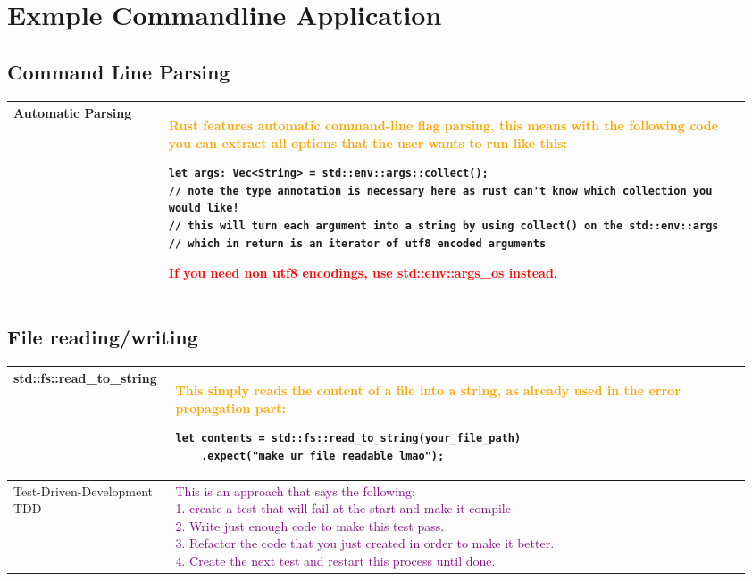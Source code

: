 \documentclass[main.tex,fontsize=8pt,paper=a4,paper=portrait,DIV=calc,]{scrartcl}
\begin{document}
\begin{table}[ht!]
\section{Exmple Commandline Application}
\subsection{Command Line Parsing}
\begin{tabular}{|m{0.2\linewidth}|m{0.755\linewidth}|}
\hline
Automatic Parsing & 
\textcolor{orange}{Rust features automatic command-line flag parsing, this means with the following code you can extract all options that the user wants to run like this:}\newline
\begin{lstlisting}
let args: Vec<String> = std::env::args::collect();
// note the type annotation is necessary here as rust can't know which collection you would like!
// this will turn each argument into a string by using collect() on the std::env::args 
// which in return is an iterator of utf8 encoded arguments
\end{lstlisting}
\textcolor{red}{If you need non utf8 encodings, use \textbf{std::env::args\_os} instead.}\\
\hline
\end{tabular}
\subsection{File reading/writing}
\begin{tabular}{|m{0.2\linewidth}|m{0.755\linewidth}|}
\hline 
std::fs::read\_to\_string & 
\textcolor{orange}{This simply reads the content of a file into a string, as already used in the error propagation part:}\newline
\begin{lstlisting}
let contents = std::fs::read_to_string(your_file_path) 
    .expect("make ur file readable lmao");
\end{lstlisting}\\
\hline
Test-Driven-Development TDD & 
\textcolor{purple}{This is an approach that says the following:\newline
\large 1. create a test that will fail at the  start and make it compile\newline
2. Write just enough code to make this test pass.\newline 
3. Refactor the code that you just created in order to make it better.\newline
4. Create the next test and restart this process until done.}\\
\hline

\hline

\hline

\hline

\hline
\end{tabular}
\end{table}
\end{document}

